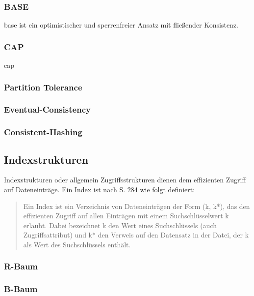 \subsubsection{BASE}
\Gls{base} ist ein optimistischer und sperrenfreier Ansatz mit fließender Konsistenz.
\cite{book:nosql-einfuehrung}

\subsubsection{CAP}
\Gls{cap}

\subsubsection{Partition Tolerance}

\subsubsection{Eventual-Consistency}

\subsubsection{Consistent-Hashing}



\subsection{Indexstrukturen}

Indexstrukturen oder allgemein Zugriffsstrukturen dienen dem effizienten Zugriff auf Dateneinträge.
Ein Index ist nach \cite{book:kudrass} S. 284 wie folgt definiert:
\begin{quote}
Ein Index ist ein Verzeichnis von Dateneinträgen der Form (k, k*), das den effizienten Zugriff auf allen Einträgen mit einem Suchschlüsselwert k erlaubt. Dabei bezeichnet k den Wert eines Suchschlüssels (auch Zugriffsattribut) und k* den Verweis auf den Datensatz in der Datei, der k als Wert des Suchschlüssels enthält.
\end{quote}


\subsubsection{R-Baum}

\subsubsection{B-Baum}

